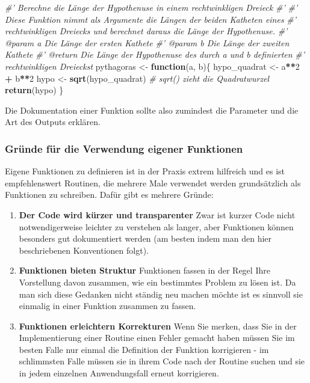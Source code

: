 \documentclass[]{book}
\newenvironment{Shaded}{\begin{snugshade}}{\end{snugshade}}
\newcommand{\KeywordTok}[1]{\textcolor[rgb]{0.13,0.29,0.53}{\textbf{#1}}}
\newcommand{\DecValTok}[1]{\textcolor[rgb]{0.00,0.00,0.81}{#1}}
\newcommand{\StringTok}[1]{\textcolor[rgb]{0.31,0.60,0.02}{#1}}
\newcommand{\CommentTok}[1]{\textcolor[rgb]{0.56,0.35,0.01}{\textit{#1}}}
\newcommand{\ControlFlowTok}[1]{\textcolor[rgb]{0.13,0.29,0.53}{\textbf{#1}}}
\newcommand{\OperatorTok}[1]{\textcolor[rgb]{0.81,0.36,0.00}{\textbf{#1}}}
\newcommand{\NormalTok}[1]{#1}
\providecommand{\tightlist}{%
  \setlength{\itemsep}{0pt}\setlength{\parskip}{0pt}}
\begin{document}
\begin{Shaded}
\begin{Highlighting}[]
\CommentTok{#' Berechne die Länge der Hypothenuse in einem rechtwinkligen Dreieck}
\CommentTok{#' }
\CommentTok{#' Diese Funktion nimmt als Argumente die Längen der beiden Katheten eines}
\CommentTok{#'  rechtwinkligen Dreiecks und berechnet daraus die Länge der Hypothenuse.}
\CommentTok{#' @param a Die Länge der ersten Kathete}
\CommentTok{#' @param b Die Länge der zweiten Kathete}
\CommentTok{#' @return Die Länge der Hypothenuse des durch a und b definierten }
\CommentTok{#'  rechtwinkligen Dreieckst}
\NormalTok{pythagoras <-}\StringTok{ }\ControlFlowTok{function}\NormalTok{(a, b)\{}
\NormalTok{  hypo_quadrat <-}\StringTok{ }\NormalTok{a}\OperatorTok{**}\DecValTok{2} \OperatorTok{+}\StringTok{ }\NormalTok{b}\OperatorTok{**}\DecValTok{2}
\NormalTok{  hypo <-}\StringTok{ }\KeywordTok{sqrt}\NormalTok{(hypo_quadrat) }\CommentTok{# sqrt() zieht die Quadratwurzel}
  \KeywordTok{return}\NormalTok{(hypo)}
\NormalTok{\}}
\end{Highlighting}
\end{Shaded}

Die Dokumentation einer Funktion sollte also zumindest die Parameter und
die Art des Outputs erklären.

\subsubsection{Gründe für die Verwendung eigener
Funktionen}\label{grunde-fur-die-verwendung-eigener-funktionen}

Eigene Funktionen zu definieren ist in der Praxis extrem hilfreich und
es ist empfehlenswert Routinen, die mehrere Male verwendet werden
grundsätzlich als Funktionen zu schreiben. Dafür gibt es mehrere Gründe:

\begin{enumerate}
\def\labelenumi{\arabic{enumi}.}
\tightlist
\item
  \textbf{Der Code wird kürzer und transparenter} Zwar ist kurzer Code
  nicht notwendigerweise leichter zu verstehen als langer, aber
  Funktionen können besonders gut dokumentiert werden (am besten indem
  man den hier beschriebenen Konventionen folgt).
\item
  \textbf{Funktionen bieten Struktur} Funktionen fassen in der Regel
  Ihre Vorstellung davon zusammen, wie ein bestimmtes Problem zu lösen
  ist. Da man sich diese Gedanken nicht ständig neu machen möchte ist es
  sinnvoll sie einmalig in einer Funktion zusammen zu fassen.
\item
  \textbf{Funktionen erleichtern Korrekturen} Wenn Sie merken, dass Sie
  in der Implementierung einer Routine einen Fehler gemacht haben müssen
  Sie im besten Falle nur einmal die Definition der Funktion korrigieren
  - im schlimmsten Falle müssen sie in ihrem Code nach der Routine
  suchen und sie in jedem einzelnen Anwendungsfall erneut korrigieren.
\end{enumerate}
\end{document}
